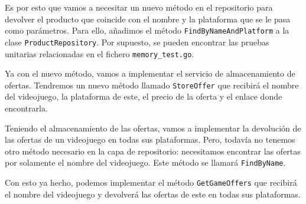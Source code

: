 Es por esto que vamos a necesitar un nuevo método en el repositorio para devolver 
el producto que coincide con el nombre y la plataforma que se le pasa como 
parámetros. Para ello, añadimos el método \verb|FindByNameAndPlatform| a la clase 
\verb|ProductRepository|. Por supuesto, se pueden encontrar las pruebas unitarias 
relacionadas en el fichero \verb|memory_test.go|.

Ya con el nuevo método, vamos a implementar el servicio de almacenamiento de 
ofertas. Tendremos un nuevo método llamado \verb|StoreOffer| que recibirá el nombre 
del videojuego, la plataforma de este, el precio de la oferta y el enlace donde 
encontrarla.

Teniendo el almacenamiento de las ofertas, vamos a implementar la devolución de las 
ofertas de un videojuego en todas sus plataformas. Pero, todavía no tenemos otro 
método necesario en la capa de repositorio: necesitamos encontrar las ofertas por 
solamente el nombre del videojuego. Este método se llamará \verb|FindByName|.

Con esto ya hecho, podemos implementar el método \verb|GetGameOffers| que recibirá 
el nombre del videojuego y devolverá las ofertas de este en todas sus plataformas.
